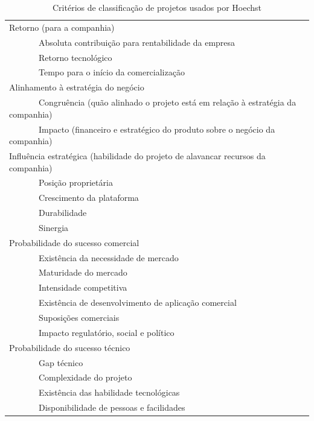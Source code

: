\documentclass[12pt,a4paper,ruledheader,tocpage=prefix,floatnumber=continuous,pagestart=folhaderosto,font=times]{abnt}
\begin{document}
\begin{table}[H]
\begin{center}
 \begin{tabular}{| >{\arraybackslash}m{6in} |}
  \hline
  Retorno (para a companhia) \\
  \ \ \ \ \ \ \ Absoluta contribuição para rentabilidade da empresa\\
  \ \ \ \ \ \ \ Retorno tecnológico\\
  \ \ \ \ \ \ \ Tempo para o início da comercialização\\
  \hline			
  Alinhamento à estratégia do negócio \\
  \ \ \ \ \ \ \  Congruência (quão alinhado o projeto está em relação à estratégia da companhia)\\
  \ \ \ \ \ \ \ Impacto (financeiro e estratégico do produto sobre o negócio da companhia)\\
  \hline			
  Influência estratégica (habilidade do projeto de alavancar recursos da companhia) \\
  \ \ \ \ \ \ \ Posição proprietária\\
  \ \ \ \ \ \ \ Crescimento da plataforma\\
  \ \ \ \ \ \ \ Durabilidade\\
  \ \ \ \ \ \ \ Sinergia\\
  \hline			
  Probabilidade do sucesso comercial\\
  \ \ \ \ \ \ \ Existência da necessidade de mercado\\
  \ \ \ \ \ \ \ Maturidade do mercado\\
  \ \ \ \ \ \ \ Intensidade competitiva\\
  \ \ \ \ \ \ \ Existência de desenvolvimento de aplicação comercial\\
  \ \ \ \ \ \ \ Suposições comerciais\\
  \ \ \ \ \ \ \ Impacto regulatório, social e político\\
  \hline			
  Probabilidade do sucesso técnico\\
  \ \ \ \ \ \ \ Gap técnico\\
  \ \ \ \ \ \ \ Complexidade do projeto\\
  \ \ \ \ \ \ \ Existência das habilidade tecnológicas\\
  \ \ \ \ \ \ \ Disponibilidade de pessoas e facilidades\\
  \hline			
 \end{tabular}
\caption{Critérios de classificação de projetos usados por Hoechst\cite{cooper}}
\end{center}
\end{table}
\end{document}
